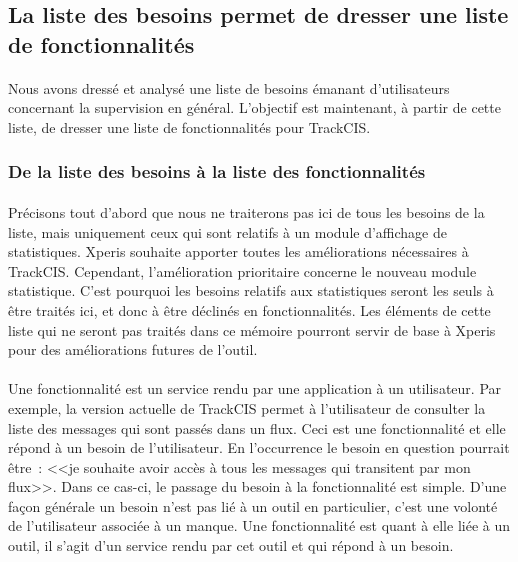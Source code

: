 	\subsection{La liste des besoins permet de dresser une liste de fonctionnalités}
		\paragraph{}%
		Nous avons dressé et analysé une liste de besoins émanant d'utilisateurs
		concernant la supervision en général. L'objectif est maintenant, à partir de
		cette liste, de dresser une liste de fonctionnalités pour TrackCIS.
		
		\subsubsection{De la liste des besoins à la liste des fonctionnalités}
			\paragraph{}%
			Précisons tout d'abord que nous ne traiterons pas ici de tous les besoins de la
			liste, mais uniquement ceux qui sont relatifs à un module d'affichage de
			statistiques. Xperis souhaite apporter toutes les améliorations nécessaires à
			TrackCIS. Cependant, l'amélioration prioritaire concerne le nouveau module
			statistique. C'est pourquoi les besoins relatifs aux statistiques seront
			les seuls à être traités ici, et donc à être déclinés en
			fonctionnalités.\newline
			Les éléments de cette liste qui ne seront pas traités dans ce mémoire
			pourront servir de base à Xperis pour des améliorations futures de l'outil.
		
			\paragraph{}%
			Une fonctionnalité est un service rendu par une application à un utilisateur.
			Par exemple, la version actuelle de TrackCIS permet à l'utilisateur de
			consulter la liste des messages qui sont passés dans un flux. Ceci est une
			fonctionnalité et elle répond à un besoin de l'utilisateur. En l'occurrence
			le besoin en question pourrait être~: <<je souhaite avoir accès à tous les messages
			qui transitent par mon flux>>.
			Dans ce cas-ci, le passage du besoin à la fonctionnalité est simple. D’une
			façon générale un besoin n'est pas lié à un outil en particulier, c'est une
			volonté de l'utilisateur associée à un manque.
			Une fonctionnalité est quant à elle liée à un outil, il
			s'agit d'un service rendu par cet outil et qui répond à un besoin.
		
